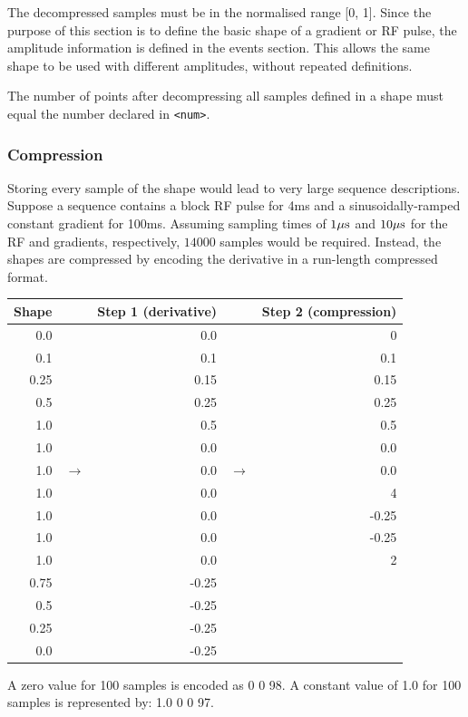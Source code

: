 \documentclass{article}
\begin{document}
The decompressed samples must be in the normalised range [0, 1]. Since the purpose of this section is to define the basic shape of a gradient or RF pulse, the amplitude information is defined in the events section. This allows the same shape to be used with different amplitudes, without repeated definitions.

The number of points after decompressing all samples defined in a shape must equal the number declared in \verb.<num>..

\subsubsection{Compression}

Storing every sample of the shape would lead to very large sequence descriptions. Suppose a sequence contains a block RF pulse for 4ms and a sinusoidally-ramped constant gradient for 100ms. Assuming sampling times of $1{\rm \mu s}$ and $10{\rm \mu s}$ for the RF and gradients, respectively, $14000$ samples would be required. Instead, the shapes are compressed by encoding the derivative in a run-length compressed format.

\begin{center}
\begin{tabular}{rrrrr}
\toprule
Shape & & Step 1 (derivative) && Step 2 (compression) \\
\midrule
0.0 && 0.0 && 0 \\
0.1 && 0.1 && 0.1 \\
0.25&& 0.15&& 0.15 \\
0.5 && 0.25&& 0.25 \\
1.0 && 0.5 && 0.5 \\
1.0 && 0.0 && 0.0 \\
1.0 & $\rightarrow$& 0.0 & $\rightarrow$ & 0.0 \\
1.0 && 0.0 && 4 \\
1.0 && 0.0 && -0.25 \\
1.0 && 0.0 && -0.25 \\
1.0 && 0.0 && 2 \\
0.75&& -0.25 \\
0.5 && -0.25 \\
0.25&& -0.25 \\
0.0 && -0.25 \\
\bottomrule
\end{tabular}
\end{center}

A zero value for 100 samples is encoded as 0 0 98. A constant value of 1.0 for 100 samples is represented by: 1.0 0 0 97.
\end{document}
